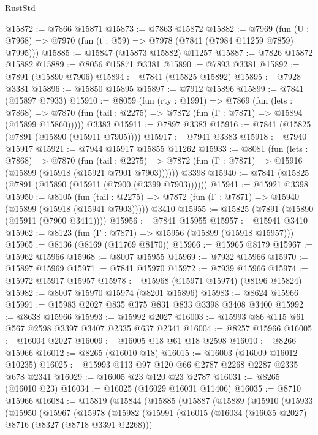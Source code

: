 \begin{lexlean}{RustStd}
\begin{coremodule}
{\begin{coremodule}
{{{{{{{{{{{{{{{{{{{{{{{{{{{{{{{{{{{{{{{{{{{{{{{{{{{{{{@15872 := @7866 @15871
@15873 := @7863 @15872
@15882 := @7969
    (fun (U : @7968) => @7970 (fun (t : @59) => @7978 (@7841 (@7984 @11259 @7859) @7995)))
@15885 := @15847 (@15873 @15882) @11257
@15887 := @7826 @15872 @15882
@15889 := @8056 @15871 @3381
@15890 := @7893 @3381
@15892 := @7891 (@15890 @7906)
@15894 := @7841 (@15825 @15892)
@15895 := @7928 @3381
@15896 := @15850 @15895
@15897 := @7912 @15896
@15899 := @7841 (@15897 @7933)
@15910 := @8059
    (fun (rty : @1991) =>
    @7869
      (fun (lets : @7868) =>
      @7870 (fun (tail : @2275) => @7872 (fun (Γ : @7871) => @15894 (@15899 @15860)))))
    @3383
@15911 := @7897 @3383
@15916 := @7841 (@15825 (@7891 (@15890 (@15911 @7905))))
@15917 := @7941 @3383
@15918 := @7940 @15917
@15921 := @7944 @15917 @15855 @11262
@15933 := @8081
    (fun (lets : @7868) =>
    @7870
      (fun (tail : @2275) =>
      @7872 (fun (Γ : @7871) => @15916 (@15899 (@15918 (@15921 @7901 @7903))))))
    @3398
@15940 := @7841 (@15825 (@7891 (@15890 (@15911 (@7900 (@3399 @7903))))))
@15941 := @15921 @3398
@15950 := @8105
    (fun (tail : @2275) => @7872 (fun (Γ : @7871) => @15940 (@15899 (@15918 (@15941 @7903)))))
    @3410
@15955 := @15825 (@7891 (@15890 (@15911 (@7900 @3411))))
@15956 := @7841 @15955
@15957 := @15941 @3410
@15962 := @8123 (fun (Γ : @7871) => @15956 (@15899 (@15918 @15957)))
@15965 := @8136 (@8169 (@11769 @8170))
@15966 := @15965 @8179
@15967 := @15962 @15966
@15968 := @8007 @15955
@15969 := @7932 @15966
@15970 := @15897 @15969
@15971 := @7841 @15970
@15972 := @7939 @15966
@15974 := @15972 @15917 @15957
@15978 := @15968 (@15971 @15974) (@8196 @15824)
@15982 := @8007 @15970 @15974 (@8201 @15896)
@15983 := @8624 @15966
@15991 := @15983 @2027 @835 @375 @831 @833 @3398 @3408 @3400
@15992 := @8638 @15966
@15993 := @15992 @2027
@16003 := @15993 @86 @115 @61 @567 @2598 @3397 @3407 @2335 @637 @2341
@16004 := @8257 @15966
@16005 := @16004 @2027
@16009 := @16005 @18 @61 @18 @2598
@16010 := @8266 @15966
@16012 := @8265 (@16010 @18)
@16015 := @16003 (@16009 @16012 @10235)
@16025 := @15993 @113 @97 @120 @66 @2787 @2268 @2287 @2335 @678 @2341
@16029 := @16005 @23 @120 @23 @2787
@16031 := @8265 (@16010 @23)
@16034 := @16025 (@16029 @16031 @11406)
@16035 := @8710 @15966
@16084 := @15819
    (@15844
      (@15885
        (@15887
          (@15889
            (@15910
              (@15933
                (@15950
                  (@15967
                    (@15978
                      (@15982
                        (@15991
                          (@16015
                            (@16034 (@16035 @2027) @8716 (@8327 (@8718 @3391 @2268)))
}}}}}}}}}}}}}}}}}}}}}}}}}}}}}}}}}}}}}}}}}}}}}}}}}}}}}}
\end{coremodule}}
\end{coremodule}
\end{lexlean}
